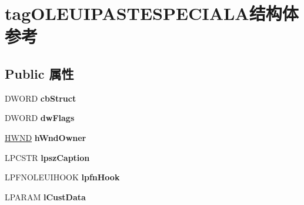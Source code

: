 \hypertarget{structtag_o_l_e_u_i_p_a_s_t_e_s_p_e_c_i_a_l_a}{}\section{tag\+O\+L\+E\+U\+I\+P\+A\+S\+T\+E\+S\+P\+E\+C\+I\+A\+L\+A结构体 参考}
\label{structtag_o_l_e_u_i_p_a_s_t_e_s_p_e_c_i_a_l_a}
\subsection*{Public 属性}
\begin{DoxyCompactItemize}
\item 
\mbox{\label{structtag_o_l_e_u_i_p_a_s_t_e_s_p_e_c_i_a_l_a_af314b47095e66bf7a1c4a31d8b6a9e33}} 
D\+W\+O\+RD {\bfseries cb\+Struct}
\item 
\mbox{\label{structtag_o_l_e_u_i_p_a_s_t_e_s_p_e_c_i_a_l_a_aea943884f80facc50e3d6e86073c2c2d}} 
D\+W\+O\+RD {\bfseries dw\+Flags}
\item 
\mbox{\label{structtag_o_l_e_u_i_p_a_s_t_e_s_p_e_c_i_a_l_a_a551dcb37104170a87a75fd77a0a51d09}} 
\hyperlink{interfacevoid}{H\+W\+ND} {\bfseries h\+Wnd\+Owner}
\item 
\mbox{\label{structtag_o_l_e_u_i_p_a_s_t_e_s_p_e_c_i_a_l_a_a640b04b913143355f6a8f53614c3bebd}} 
L\+P\+C\+S\+TR {\bfseries lpsz\+Caption}
\item 
\mbox{\label{structtag_o_l_e_u_i_p_a_s_t_e_s_p_e_c_i_a_l_a_af0b06cfa31c0611f05909b82224e3386}} 
L\+P\+F\+N\+O\+L\+E\+U\+I\+H\+O\+OK {\bfseries lpfn\+Hook}
\item 
\mbox{\label{structtag_o_l_e_u_i_p_a_s_t_e_s_p_e_c_i_a_l_a_ab2a5775beddbbe8c8ccdcf97b431467f}} 
L\+P\+A\+R\+AM {\bfseries l\+Cust\+Data}
\item 
\mbox{\label{structtag_o_l_e_u_i_p_a_s_t_e_s_p_e_c_i_a_l_a_aa8d616f430eed17a72ebdbfae8f6ad37}} 

\end{DoxyCompactItemize}

